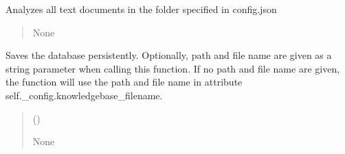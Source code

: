 \documentclass[letterpaper,10pt,english]{sphinxmanual}
\begin{document}
\begin{fulllineitems}
\begin{fulllineitems}
\end{fulllineitems}


\begin{fulllineitems}
\label{\detokenize{medextractor.knowledge:medextractor.knowledge.knowledge_extractor.KnowledgeExtractor.process_texts}}
\pysigstartsignatures
{}
\pysigstopsignatures
\sphinxAtStartPar
Analyzes all text documents in the folder specified in config.json
\begin{quote}\begin{description}
\sphinxAtStartPar
{} \textendash{} 

\sphinxAtStartPar
None

\end{description}\end{quote}

\end{fulllineitems}


\begin{fulllineitems}
\label{\detokenize{medextractor.knowledge:medextractor.knowledge.knowledge_extractor.KnowledgeExtractor.saveKB}}
\pysigstartsignatures
{}
\pysigstopsignatures
\sphinxAtStartPar
Saves the database persistently. Optionally, path and file name are given
as a string parameter when calling this function. If no path and file name
are given, the function will use the path and file name in attribute
self.\_config.knowledgebase\_filename.
\begin{quote}\begin{description}
\sphinxAtStartPar
{} () \textendash{} 

\sphinxAtStartPar
None


\end{description}
\end{quote}
\end{fulllineitems}
\end{fulllineitems}
\end{document}
